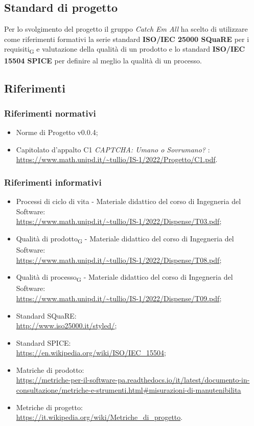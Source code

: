 \subsection{Standard di progetto}
Per lo svolgimento del progetto il gruppo \textit{Catch Em All} ha scelto di utilizzare come riferimenti formativi la serie standard \textbf{ISO/IEC 25000 SQuaRE} per i requisiti\textsubscript{G} e valutazione della qualità di un prodotto e lo standard \textbf{ISO/IEC 15504 SPICE} per definire al meglio la qualità di un processo.

\subsection{Riferimenti}
\subsubsection{Riferimenti normativi}\:
\begin{itemize}
	\item Norme di Progetto v0.0.4;
	\item Capitolato d'appalto C1 \textit{CAPTCHA: Umano o Sovrumano?} : \\
		\url{https://www.math.unipd.it/~tullio/IS-1/2022/Progetto/C1.pdf}.
\end{itemize}
	
\subsubsection{Riferimenti informativi}\:
\begin{itemize}
	\item Processi di ciclo di vita - Materiale didattico del corso di Ingegneria del Software: \\
		\url{https://www.math.unipd.it/~tullio/IS-1/2022/Dispense/T03.pdf};
	\item Qualità di prodotto\textsubscript{G} - Materiale didattico del corso di Ingegneria del Software: \\
		\url{https://www.math.unipd.it/~tullio/IS-1/2022/Dispense/T08.pdf};
	\item Qualità di processo\textsubscript{G} - Materiale didattico del corso di Ingegneria del Software: \\
		\url{https://www.math.unipd.it/~tullio/IS-1/2022/Dispense/T09.pdf};
	\item Standard SQuaRE: \\
		\url{http://www.iso25000.it/styled/};
	\item Standard SPICE: \\
		\url{https://en.wikipedia.org/wiki/ISO/IEC_15504};
	\item Matriche di prodotto: \\
		\url{https://metriche-per-il-software-pa.readthedocs.io/it/latest/documento-in-consultazione/metriche-e-strumenti.html#misurazioni-di-manutenibilita}
	\item Metriche di progetto: \\
		\url{https://it.wikipedia.org/wiki/Metriche_di_progetto}.
\end{itemize}

